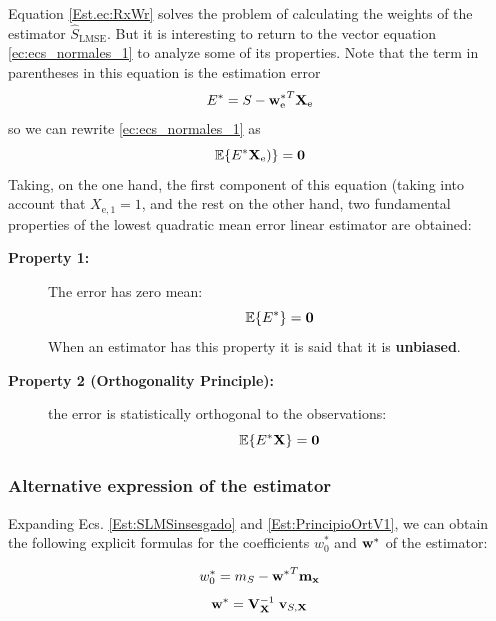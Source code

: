 Equation \eqref{Est.ec:RxWr} solves the problem of calculating the weights of the estimator $\hat S_\text{LMSE}$. But it is interesting to return to the vector equation  \eqref{ec:ecs_normales_1} to analyze some of its properties. Note that the term in parentheses in this equation is the estimation error
\begin{equation}
E^* = S - {{\bf w}_{\text{e}}^*}^T {\bf X}_{\text{e}}
\end{equation}
so we can rewrite \eqref{ec:ecs_normales_1} as
\begin{equation}
\label{Est:SLMSinsesgado0}
\mathbb{E}\{E^* {\bf X}_{\text{e}})\} = {\bf 0}
\end{equation}
Taking, on the one hand, the first component of this equation (taking into account that $X_{\text{e},1}=1$, and the rest on the other hand, two fundamental properties of the lowest quadratic mean error linear estimator are obtained:
\begin{description}
\item[{\bf Property 1:}] The error has zero mean:
\begin{equation}
\label{Est:SLMSinsesgado}
\mathbb{E}\{E^*\} = {\bf 0}
\end{equation}
When an estimator has this property it is said that it is {\bf unbiased}.%
\item [{\bf Property 2 (Orthogonality Principle):}] the error is statistically orthogonal to the observations:
\begin{equation}
\label{Est:PrincipioOrtV1}
\mathbb{E}\{E^* {\bf X}\} = {\bf 0}
\end{equation}
\end{description}



\subsubsection{{Alternative expression of the estimator}}
Expanding Ecs. \eqref{Est:SLMSinsesgado} and \eqref{Est:PrincipioOrtV1}, we can obtain the following explicit formulas for the coefficients $w_0^*$ and ${\bf w}^*$ of the estimator:

\begin{framed}
\begin{equation}
w_0^* = m_S - {{\bf w}^*}^T{\bf m_x} 
\label{ec:solucionw0}
\end{equation}
\begin{equation}
\label{ec:solucionw}
{\bf w}^* = {{\bf V}_{\bf X}^{-1}} \; {\bf v}_{S,{\bf X}}\end{equation}
\end{framed}

